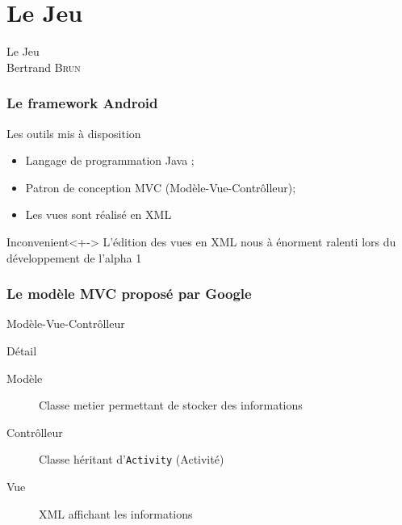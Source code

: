 \documentclass{beamer}
\def\android{Android\texttrademark}
\begin{document}
\section{Le Jeu}
\begin{frame}
\begin{center}
  Le Jeu\\Bertrand \textsc{Brun}
\end{center}
\end{frame}
\begin{frame}
\frametitle{Le framework \android{}}
\begin{block}{Les outils mis à disposition}
  \begin{itemize}
    \item<+-> Langage de programmation Java ;
    \item<+-> Patron de conception MVC (Modèle-Vue-Contrôlleur);
    \item<+-> Les vues sont réalisé en XML
  \end{itemize}
\end{block}
\begin{alertblock}{Inconvenient}<+->
  L'édition des vues en XML nous à énorment ralenti lors du développement de l'alpha 1
\end{alertblock}
\end{frame}

\begin{frame}
\frametitle{Le modèle MVC proposé par Google}
\begin{block}{Modèle-Vue-Contrôlleur}
  \centering
\end{block}
\begin{block}{Détail}
\begin{description}
  \item[Modèle] Classe metier permettant de stocker des informations
  \item[Contrôlleur] Classe héritant d'\verb!Activity! (Activité)
  \item[Vue] XML affichant les informations
\end{description}
\end{block}
\end{frame}
\end{document}
